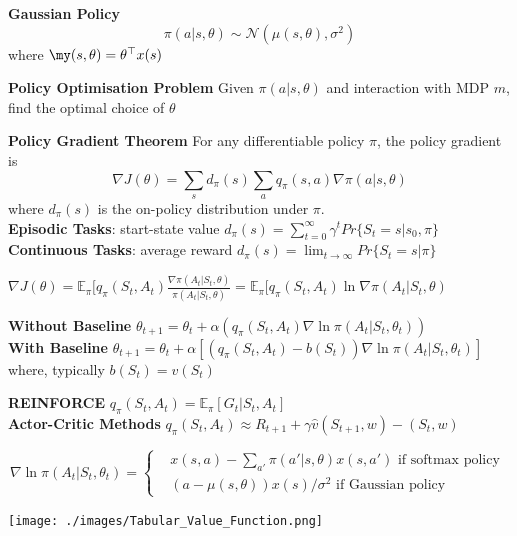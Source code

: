 \documentclass[10pt,landscape]{article}
\begin{document}
\begin{multicols}{3}
\textbf{Gaussian Policy} $$\pi(a|s, \theta) \sim \mathcal{N}(\mu(s, \theta), \sigma^2)$$ where $\my(s, \theta) = \theta^\top x(s)$

\textbf{Policy Optimisation Problem} Given $\pi(a|s, \theta)$ and interaction with MDP $m$, find the optimal choice of $\theta$

\textbf{Policy Gradient Theorem} For any differentiable policy $\pi$, the policy gradient is $$\nabla J(\theta) = \sum_s d_\pi (s) \sum_a q_\pi (s,a) \nabla \pi(a|s, \theta)$$ where $d_\pi(s)$ is the on-policy distribution under $\pi$. \\

\textbf{Episodic Tasks}: start-state value $d_\pi (s) = \sum_{t=0}^\infty \gamma^t Pr\{S_t = s | s_0, \pi\}$
\textbf{Continuous Tasks}: average reward $d_\pi (s) = \lim_{t \rightarrow \infty} Pr\{S_t = s | \pi\}$

$\nabla J(\theta) = \mathbb{E}_\pi [q_\pi(S_t, A_t) \frac{\nabla \pi(A_t | S_t, \theta)}{\pi (A_t | S_t, \theta)} = \mathbb{E}_\pi [q_\pi(S_t, A_t) \ln \nabla \pi(A_t | S_t, \theta)$

\textbf{Without Baseline} $\theta_{t+1} = \theta_t + \alpha(q_\pi(S_t, A_t) \nabla \ln \pi(A_t | S_t, \theta_t))$ \\
\textbf{With Baseline} $\theta_{t+1} = \theta_t + \alpha[(q_\pi(S_t, A_t) - b(S_t)) \nabla \ln \pi(A_t | S_t, \theta_t)]$ where, typically $b(S_t) = \hat{v}(S_t)$

\textbf{REINFORCE} $q_\pi(S_t, A_t) = \mathbb{E}_\pi [G_t | S_t, A_t]$ \\

\textbf{Actor-Critic Methods} $q_\pi(S_t, A_t) \approx R_{t+1} + \gamma \hat{v}(S_{t+1}, w) - (S_{t}, w)$


$$\nabla \ln \pi(A_t | S_t, \theta_t) = \begin{cases}& x(s,a) - \sum_{a'} \pi(a' | s, \theta) x(s, a') \text{ if softmax policy } \\ & (a - \mu(s, \theta)) x(s)/\sigma^2 \text{ if Gaussian policy }\end{cases}$$

\begin{center}
\texttt{[image: ./images/Tabular\_Value\_Function.png]}
\end{center}
\end{multicols}
\end{document}
